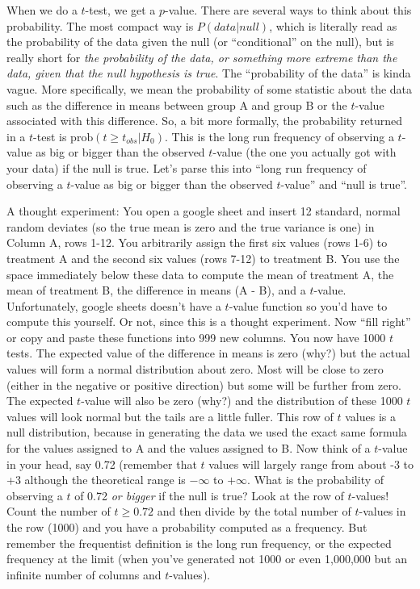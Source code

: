 \documentclass[]{book}
\theoremstyle{definition}
\theoremstyle{definition}
\theoremstyle{definition}
\theoremstyle{remark}
\begin{document}
When we do a \(t\)-test, we get a \(p\)-value. There are several ways to
think about this probability. The most compact way is
\(P(data | null)\), which is literally read as the probability of the
data given the null (or ``conditional'' on the null), but is really
short for \emph{the probability of the data, or something more extreme
than the data, given that the null hypothesis is true}. The
``probability of the data'' is kinda vague. More specifically, we mean
the probability of some statistic about the data such as the difference
in means between group A and group B or the \(t\)-value associated with
this difference. So, a bit more formally, the probability returned in a
\(t\)-test is \(\mathrm{prob}(t \ge t_{obs} | H_0)\). This is the long
run frequency of observing a \(t\)-value as big or bigger than the
observed \(t\)-value (the one you actually got with your data) if the
null is true. Let's parse this into ``long run frequency of observing a
\(t\)-value as big or bigger than the observed \(t\)-value'' and ``null
is true''.

A thought experiment: You open a google sheet and insert 12 standard,
normal random deviates (so the true mean is zero and the true variance
is one) in Column A, rows 1-12. You arbitrarily assign the first six
values (rows 1-6) to treatment A and the second six values (rows 7-12)
to treatment B. You use the space immediately below these data to
compute the mean of treatment A, the mean of treatment B, the difference
in means (A - B), and a \(t\)-value. Unfortunately, google sheets
doesn't have a \(t\)-value function so you'd have to compute this
yourself. Or not, since this is a thought experiment. Now ``fill right''
or copy and paste these functions into 999 new columns. You now have
1000 \(t\) tests. The expected value of the difference in means is zero
(why?) but the actual values will form a normal distribution about zero.
Most will be close to zero (either in the negative or positive
direction) but some will be further from zero. The expected \(t\)-value
will also be zero (why?) and the distribution of these 1000 \(t\) values
will look normal but the tails are a little fuller. This row of \(t\)
values is a null distribution, because in generating the data we used
the exact same formula for the values assigned to A and the values
assigned to B. Now think of a \(t\)-value in your head, say 0.72
(remember that \(t\) values will largely range from about -3 to +3
although the theoretical range is \(-\infty\) to \(+\infty\). What is
the probability of observing a \(t\) of 0.72 \emph{or bigger} if the
null is true? Look at the row of \(t\)-values! Count the number of
\(t \ge 0.72\) and then divide by the total number of \(t\)-values in
the row (1000) and you have a probability computed as a frequency. But
remember the frequentist definition is the long run frequency, or the
expected frequency at the limit (when you've generated not 1000 or even
1,000,000 but an infinite number of columns and \(t\)-values).
\end{document}
